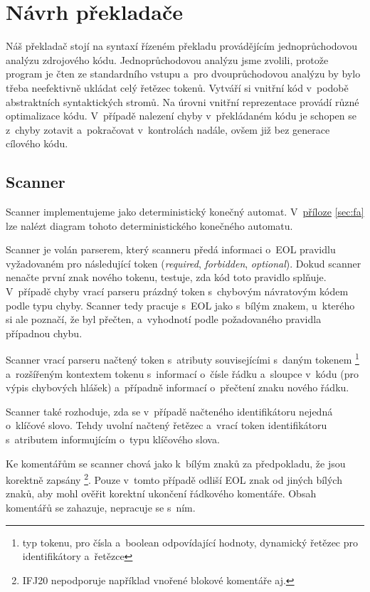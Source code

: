 \documentclass[11pt]{article}
\begin{document}
\section{Návrh překladače}

Náš překladač stojí na syntaxí řízeném překladu provádějícím jednoprůchodovou analýzu zdrojového kódu. Jednoprůchodovou analýzu jsme zvolili, protože program je čten ze standardního vstupu a~pro dvouprůchodovou analýzu by bylo třeba neefektivně ukládat celý řetězec tokenů. Vytváří si vnitřní kód v~podobě abstraktních syntaktických stromů. Na úrovni vnitřní reprezentace provádí různé optimalizace kódu. V~případě nalezení chyby v~překládaném kódu je schopen se z~chyby zotavit a~pokračovat v~kontrolách nadále, ovšem již bez generace cílového kódu.

\subsection{Scanner}
\label{scanner}

Scanner implementujeme jako deterministický konečný automat. V~\hyperref[sec:fa]{příloze} \ref{sec:fa} lze nalézt diagram tohoto deterministického konečného automatu.

Scanner je volán parserem, který scanneru předá informaci o~EOL pravidlu vyžadovaném pro následující token (\emph{required}, \emph{forbidden}, \emph{optional}). Dokud scanner nenačte první znak nového tokenu, testuje, zda kód toto pravidlo splňuje. V~případě chyby vrací parseru prázdný token s~chybovým návratovým kódem podle typu chyby. Scanner tedy pracuje s~EOL jako s~bílým znakem, u~kterého si ale poznačí, že byl přečten, a~vyhodnotí podle požadovaného pravidla případnou chybu.

Scanner vrací parseru načtený token s~atributy souvisejícími s~daným tokenem \footnote{typ tokenu, pro čísla a~boolean odpovídající hodnoty, dynamický řetězec pro identifikátory a~řetězce} a~rozšířeným kontextem tokenu s~informací o~čísle řádku a~sloupce v~kódu (pro výpis chybových hlášek) a~případně informací o~přečtení znaku nového řádku.

Scanner také rozhoduje, zda se v~případě načteného identifikátoru nejedná o~klíčové slovo. Tehdy uvolní načtený řetězec a~vrací token identifikátoru s~atributem informujícím o~typu klíčového slova.

Ke komentářům se scanner chová jako k~bílým znaků za předpokladu, že jsou korektně zapsány \footnote{IFJ20 nepodporuje například vnořené blokové komentáře aj.}. Pouze v~tomto případě odliší EOL znak od jiných bílých znaků, aby mohl ověřit korektní ukončení řádkového komentáře. Obsah komentářů se zahazuje, nepracuje se s~ním.
\end{document}

